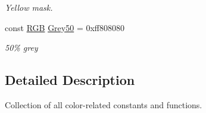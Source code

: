 \begin{DoxyCompactItemize}
\begin{DoxyCompactList}\small\item\em Yellow mask. \end{DoxyCompactList}\item 
\hypertarget{namespaceGUI_1_1Color_a58c34a779d4e96011115e6715156700e}{const \hyperlink{namespaceGUI_aeafd135255365f3584da0e982fc79466}{R\-G\-B} \hyperlink{namespaceGUI_1_1Color_a58c34a779d4e96011115e6715156700e}{Grey50} = 0xff808080}\label{namespaceGUI_1_1Color_a58c34a779d4e96011115e6715156700e}

\begin{DoxyCompactList}\small\item\em 50\% grey \end{DoxyCompactList}\end{DoxyCompactItemize}


\subsection{Detailed Description}
Collection of all color-\/related constants and functions. 